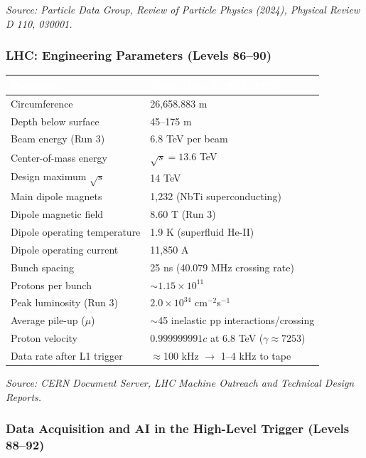 \documentclass[11pt,letterpaper]{article}
\newcommand{\tableheader}[1]{\textbf{\sffamily\textcolor{white}{#1}}}
\begin{document}
\textit{Source: Particle Data Group, Review of Particle Physics (2024), Physical Review D 110, 030001.}

\subsubsection{LHC: Engineering Parameters (Levels 86--90)}

\begin{center}
\begin{tabularx}{\textwidth}{L{5cm}X}
\toprule
{}
\tableheader{Parameter} & \tableheader{Value (Run 3, 2022--2025)} \\
\midrule
Circumference & 26,658.883 m \\
Depth below surface & 45--175 m \\
Beam energy (Run 3) & 6.8 TeV per beam \\
Center-of-mass energy & $\sqrt{s} = 13.6$ TeV \\
Design maximum $\sqrt{s}$ & 14 TeV \\
Main dipole magnets & 1,232 (NbTi superconducting) \\
Dipole magnetic field & 8.60 T (Run 3) \\
Dipole operating temperature & 1.9 K (superfluid He-II) \\
Dipole operating current & 11,850 A \\
Bunch spacing & 25 ns (40.079 MHz crossing rate) \\
Protons per bunch & $\sim 1.15 \times 10^{11}$ \\
Peak luminosity (Run 3) & $2.0 \times 10^{34}$ cm$^{-2}$s$^{-1}$ \\
Average pile-up ($\mu$) & $\sim$45 inelastic pp interactions/crossing \\
Proton velocity & $0.999999991c$ at 6.8 TeV ($\gamma \approx 7253$) \\
Data rate after L1 trigger & $\approx$100 kHz $\rightarrow$ 1--4 kHz to tape \\
\bottomrule
\end{tabularx}
\end{center}

\textit{Source: CERN Document Server, LHC Machine Outreach and Technical Design Reports.}

\subsubsection{Data Acquisition and AI in the High-Level Trigger (Levels 88--92)}
\end{document}
